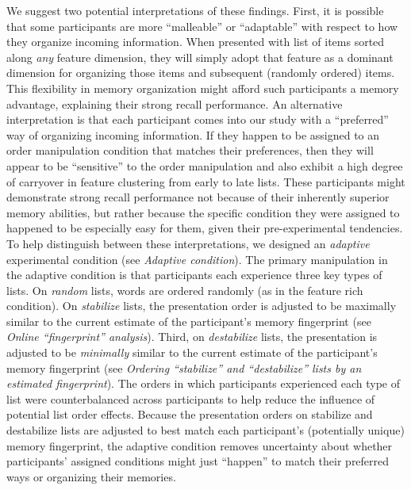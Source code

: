 \documentclass[11pt]{article}
\begin{document}
We suggest two potential interpretations of these findings. First, it is
possible that some participants are more ``malleable'' or ``adaptable'' with
respect to how they organize incoming information. When presented with list of
items sorted along \textit{any} feature dimension, they will simply adopt that
feature as a dominant dimension for organizing those items and subsequent
(randomly ordered) items. This flexibility in memory organization might afford
such participants a memory advantage, explaining their strong recall
performance. An alternative interpretation is that each participant comes into
our study with a ``preferred'' way of organizing incoming information. If they
happen to be assigned to an order manipulation condition that matches their
preferences, then they will appear to be ``sensitive'' to the order
manipulation and also exhibit a high degree of carryover in feature clustering
from early to late lists. These participants might demonstrate strong recall
performance not because of their inherently superior memory abilities, but
rather because the specific condition they were assigned to happened to be
especially easy for them, given their pre-experimental tendencies. To help
distinguish between these interpretations, we designed an \textit{adaptive}
experimental condition (see \textit{Adaptive condition}). The primary
manipulation in the adaptive condition is that participants each experience
three key types of lists. On \textit{random} lists, words are ordered randomly
(as in the feature rich condition). On \textit{stabilize} lists, the
presentation order is adjusted to be maximally similar to the current estimate
of the participant's memory fingerprint (see \textit{Online “fingerprint”
analysis}). Third, on \textit{destabilize} lists, the presentation is adjusted
to be \textit{minimally} similar to the current estimate of the participant's
memory fingerprint (see \textit{Ordering ``stabilize'' and ``destabilize''
lists by an estimated fingerprint}). The orders in which participants
experienced each type of list were counterbalanced across participants to help
reduce the influence of potential list order effects. Because the presentation
orders on stabilize and destabilize lists are adjusted to best match each
participant's (potentially unique) memory fingerprint, the adaptive condition
removes uncertainty about whether participants' assigned conditions might just
``happen'' to match their preferred ways or organizing their memories.
\end{document}
